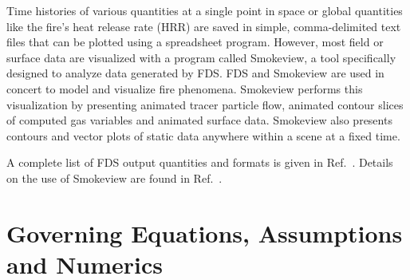 \documentclass[11pt]{book}
\begin{document}
Time histories of various quantities at a single point in space or global quantities like the fire's heat release rate (HRR) are saved in simple,
comma-delimited text files that can be plotted using a spreadsheet program. However, most field or surface data are visualized with a program called
Smokeview, a tool specifically designed to analyze data generated by FDS. FDS and Smokeview are used in concert to model and visualize fire
phenomena. Smokeview performs this visualization by presenting animated tracer particle flow, animated contour slices of computed gas variables and
animated surface data. Smokeview also presents contours and vector plots of static data anywhere within a scene at a fixed time.

A complete list of FDS output quantities and formats is given in Ref.~\cite{FDS_Users_Guide}. Details on the use of Smokeview are found in
Ref.~\cite{Smokeview_Users_Guide}.




\section{Governing Equations, Assumptions and Numerics}
\end{document}
